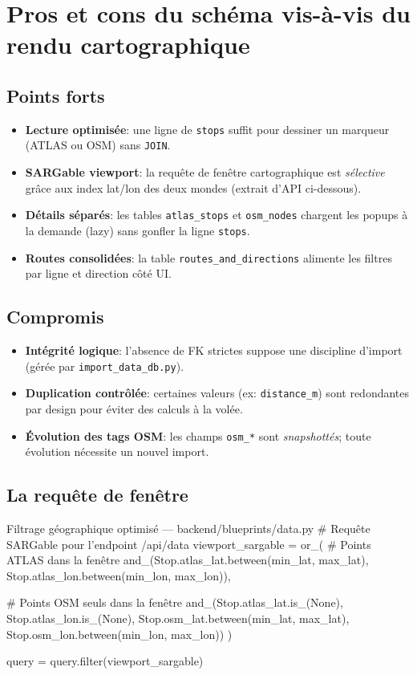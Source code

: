 \section{Pros et cons du schéma vis-à-vis du rendu cartographique}
\subsection*{Points forts}
\begin{itemize}
  \item \textbf{Lecture optimisée}: une ligne de \texttt{stops} suffit pour dessiner un marqueur (ATLAS ou OSM) sans \texttt{JOIN}.
  \item \textbf{SARGable viewport}: la requête de fenêtre cartographique est \emph{sélective} grâce aux index lat/lon des deux mondes (extrait d'API ci-dessous).
  \item \textbf{Détails séparés}: les tables \texttt{atlas\_stops} et \texttt{osm\_nodes} chargent les popups à la demande (lazy) sans gonfler la ligne \texttt{stops}.
  \item \textbf{Routes consolidées}: la table \texttt{routes\_and\_directions} alimente les filtres par ligne et direction côté UI.
\end{itemize}

\subsection*{Compromis}
\begin{itemize}
  \item \textbf{Intégrité logique}: l'absence de FK strictes suppose une discipline d'import (gérée par \texttt{import\_data\_db.py}).
  \item \textbf{Duplication contrôlée}: certaines valeurs (ex: \texttt{distance\_m}) sont redondantes par design pour éviter des calculs à la volée.
  \item \textbf{Évolution des tags OSM}: les champs \texttt{osm\_*} sont \textit{snapshottés}; toute évolution nécessite un nouvel import.
\end{itemize}

\subsection*{La requête de fenêtre}

\begin{codebox}[language=Python]{Filtrage géographique optimisé — backend/blueprints/data.py}
# Requête SARGable pour l'endpoint /api/data
viewport_sargable = or_(
    # Points ATLAS dans la fenêtre
    and_(Stop.atlas_lat.between(min_lat, max_lat),
         Stop.atlas_lon.between(min_lon, max_lon)),
    
    # Points OSM seuls dans la fenêtre  
    and_(Stop.atlas_lat.is_(None), Stop.atlas_lon.is_(None),
         Stop.osm_lat.between(min_lat, max_lat),
         Stop.osm_lon.between(min_lon, max_lon))
)

query = query.filter(viewport_sargable)
\end{codebox}


